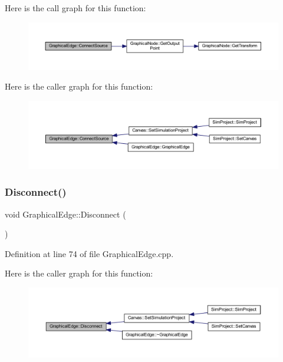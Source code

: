 Here is the call graph for this function\+:
\nopagebreak
\begin{figure}[H]
\begin{center}
\leavevmode
\includegraphics[width=350pt]{class_graphical_edge_a9f2e7f370705c390ad67f5b18ed80a00_cgraph}
\end{center}
\end{figure}
Here is the caller graph for this function\+:
\nopagebreak
\begin{figure}[H]
\begin{center}
\leavevmode
\includegraphics[width=350pt]{class_graphical_edge_a9f2e7f370705c390ad67f5b18ed80a00_icgraph}
\end{center}
\end{figure}
\mbox{\label{class_graphical_edge_acc50ad4ea639802ce7d700d17f28f0e3}} 
\subsubsection{\texorpdfstring{Disconnect()}{Disconnect()}}
{\footnotesize\ttfamily void Graphical\+Edge\+::\+Disconnect (\begin{DoxyParamCaption}{ }\end{DoxyParamCaption})}



Definition at line 74 of file Graphical\+Edge.\+cpp.

Here is the caller graph for this function\+:
\nopagebreak
\begin{figure}[H]
\begin{center}
\leavevmode
\includegraphics[width=350pt]{class_graphical_edge_acc50ad4ea639802ce7d700d17f28f0e3_icgraph}
\end{center}
\end{figure}
\mbox{\label{class_graphical_edge_a48170a7fc9e86d92985d694addca8837}} 
